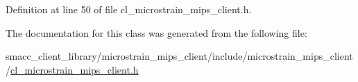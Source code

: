 Definition at line 50 of file cl\+\_\+microstrain\+\_\+mips\+\_\+client.\+h.



The documentation for this class was generated from the following file\+:\begin{DoxyCompactItemize}
\item 
smacc\+\_\+client\+\_\+library/microstrain\+\_\+mips\+\_\+client/include/microstrain\+\_\+mips\+\_\+client/\hyperlink{cl__microstrain__mips__client_8h}{cl\+\_\+microstrain\+\_\+mips\+\_\+client.\+h}\end{DoxyCompactItemize}
